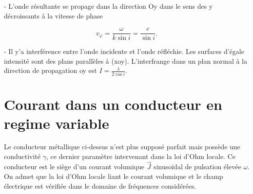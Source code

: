 \begin{quest}
{- L'onde résultante se propage dans la direction Oy dans le sens des y décroissants à la vitesse de phase

$$
v_{\varphi}=\frac{\omega}{k \sin i}=\frac{c}{\sin i} .
$$

- Il y'a interférence entre l'onde incidente et l'onde réfléchie. Les surfaces d'égale intensité sont des plans parallèles à (xoy). L'interfrange dans un plan normal à la direction de propagation oy est $I=\frac{\lambda}{2 \cos i}$.
            }
        \end{quest}

        \section{Courant dans un conducteur en regime variable}
        Le conducteur métallique ci-dessus n'est plus supposé parfait mais possède une conductivité \(\gamma\), ce dernier paramètre intervenant dans la loi d'Ohm locale. Ce conducteur est le siège d'un courant volumique \(\Vec{J}\) sinusoïdal de pulsation élevée \(\omega\). On admet que la loi d'Ohm locale liant le courant volumique et le champ électrique est vérifiée dans le domaine de fréquences considérées.
